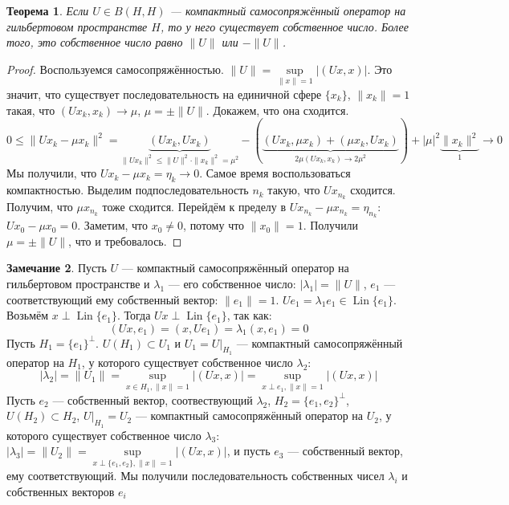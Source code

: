 \documentclass[11pt,openany,a4paper]{scrartcl}
\theoremstyle{plain}
\newtheorem{theorem}{Теорема}[section]
\theoremstyle{definition}
\newtheorem{remark}[theorem]{Замечание}
\DeclareMathOperator{\Lin}{Lin}
\begin{document}
\begin{theorem}
    Если $U \in B(H, H)$ — компактный самосопряжённый оператор на гильбертовом пространстве $H$, то
    у него существует собственное число. Более того, это собственное число равно $\|U\|$ или
    $-\|U\|$.
\end{theorem}
\begin{proof}
    Воспользуемся самосопряжённостью. $\|U\| = \sup\limits_{\|x\|=1}|(Ux, x)|$. Это значит,
    что существует последовательность на единичной сфере $\{x_k\}$, $\|x_k\|=1$ такая, что
    $(Ux_k, x_k) \to \mu$, $\mu = \pm \|U\|$. Докажем, что она сходится.
    $$
    0 \leqslant \|Ux_k - \mu x_k\|^2 =
    \underbrace{(Ux_k, Ux_k)}_{\|Ux_k\|^2 \leqslant \|U\|^2 \cdot \|x_k\|^2 = \mu^2} -
    (\underbrace{(Ux_k, \mu x_k) + (\mu x_k, Ux_k)}_{2\mu(Ux_k, x_k) \to 2 \mu^2})
    + |\mu|^2\underbrace{\|x_k\|^2}_{1} \to 0
    $$
    Мы получили, что $Ux_k - \mu x_k = \eta_k \to 0$. Самое время воспользоваться компактностью.
    Выделим подпоследовательность $n_k$ такую, что $Ux_{n_k}$ сходится. Получим, что
    $\mu x_{n_k}$ тоже сходится. Перейдём к пределу в $Ux_{n_k} - \mu x_{n_k} = \eta_{n_k}$:
    $Ux_0 - \mu x_0 = 0$. Заметим, что $x_0 \neq 0$, потому что $\|x_0\| = 1$. Получили
    $\mu = \pm \|U\|$, что и требовалось.
\end{proof}

\begin{remark}\label{eigennumber_sequence}
    Пусть $U$ — компактный самосопряжённый оператор на гильбертовом пространстве и $\lambda_1$ — 
    его собственное число: $|\lambda_1| = \|U\|$, $e_1$ — соответствующий ему собственный вектор:
    $\|e_1\| = 1$. $Ue_1 = \lambda_1 e_1 \in \Lin\{e_1\}$. Возьмём $x \perp \Lin\{e_1\}$. Тогда
    $Ux \perp \Lin\{e_1\}$, так как:
    $$
    (Ux, e_1) = (x, Ue_1) = \lambda_1(x, e_1) = 0
    $$
    Пусть $H_1 = \{e_1\}^\perp$. $U(H_1) \subset U_1$ и $U_1 = U|_{H_1}$ — компактный 
    самосопряжённый оператор на $H_1$, у которого существует собственное число
    $\lambda_2$:
    $$
    |\lambda_2| = \|U_1\| = \sup\limits_{x \in H_1, \|x\|=1} |(Ux, x)| =
    \sup\limits_{x \perp e_1, \|x\|=1} |(Ux, x)|
    $$
    Пусть $e_2$ — собственный вектор, соотвествующий $\lambda_2$, $H_2 = \{e_1, e_2\}^\perp$,
    $U(H_2) \subset H_2$, $U|_{H_1} = U_2$ — компактный самосопряжённый оператор на $U_2$, у 
    которого существует собственное число $\lambda_3$: $|\lambda_3| = \|U_2\| =
    \sup\limits_{x\perp\{e_1,e_2\}, \|x\|=1} |(Ux, x)|$, и пусть $e_3$ — собственный вектор, ему
    соответствующий. Мы получили последовательность собственных чисел $\lambda_i$ и собственных
    векторов $e_i$
\end{remark}
\end{document}
